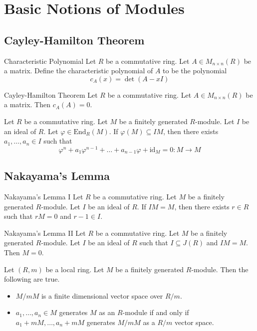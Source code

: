 \documentclass[a4paper]{article}
\begin{document}
\pagebreak
\section{Basic Notions of Modules}
\subsection{Cayley-Hamilton Theorem}
\begin{defn}{Characteristic Polynomial}{} Let $R$ be a commutative ring. Let $A\in M_{n\times n}(R)$ be a matrix. Define the characteristic polynomial of $A$ to be the polynomial $$c_A(x)=\det(A-xI)$$
\end{defn}

\begin{thm}{Cayley-Hamilton Theorem}{} Let $R$ be a commutative ring. Let $A\in M_{n\times n}(R)$ be a matrix. Then $c_A(A)=0$. 
\end{thm}

\begin{crl}{}{} Let $R$ be a commutative ring. Let $M$ be a finitely generated $R$-module. Let $I$ be an ideal of $R$. Let $\varphi\in\text{End}_R(M)$. If $\varphi(M)\subseteq IM$, then there exists $a_1,\dots,a_n\in I$ such that $$\varphi^n+a_1\varphi^{n-1}+\dots+a_{n-1}\varphi+\text{id}_M=0:M\to M$$
\end{crl}

\subsection{Nakayama's Lemma}
\begin{lmm}{Nakayama's Lemma I}{} Let $R$ be a commutative ring. Let $M$ be a finitely generated $R$-module. Let $I$ be an ideal of $R$. If $IM=M$, then there exists $r\in R$ such that $rM=0$ and $r-1\in I$. 
\end{lmm}

\begin{lmm}{Nakayama's Lemma II}{} Let $R$ be a commutative ring. Let $M$ be a finitely generated $R$-module. Let $I$ be an ideal of $R$ such that $I\subseteq J(R)$ and $IM=M$. Then $M=0$. 
\end{lmm}

\begin{crl}{}{} Let $(R,m)$ be a local ring. Let $M$ be a finitely generated $R$-module. Then the following are true. 
\begin{itemize}
\item $M/mM$ is a finite dimensional vector space over $R/m$. 
\item $a_1,\dots,a_n\in M$ generates $M$ as an $R$-module if and only if $a_1+mM,\dots,a_n+mM$ generates $M/mM$ as a $R/m$ vector space. 
\end{itemize}
\end{crl}
\end{document}
